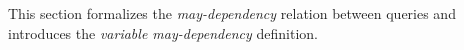 %
%
This section formalizes the \emph{may-dependency} relation between queries and introduces the
\emph{variable may-dependency} definition.

